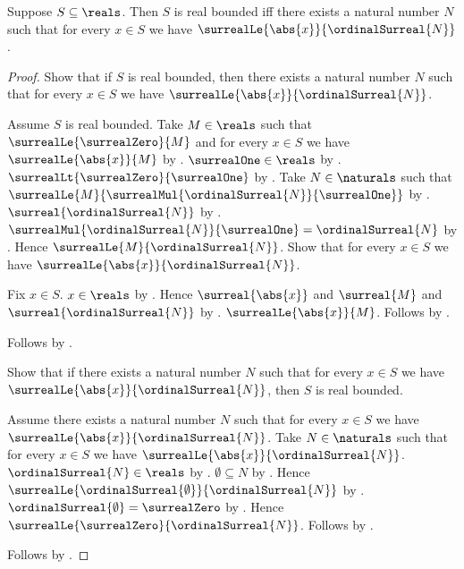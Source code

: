 \begin{theorem}\label{real_bounded_iff_has_natural_bound}
    Suppose $S\subseteq\reals$.
    Then $S$ is real bounded iff there exists a natural number $N$ such that
        for every $x\in S$ we have
            $\surrealLe{\abs{x}}{\ordinalSurreal{N}}$.
\end{theorem}
\begin{proof}
    Show that if $S$ is real bounded, then there exists a natural number
        $N$ such that for every $x\in S$ we have
            $\surrealLe{\abs{x}}{\ordinalSurreal{N}}$.
    \begin{subproof}
        Assume $S$ is real bounded.
        Take $M\in\reals$ such that $\surrealLe{\surrealZero}{M}$ and
            for every $x\in S$ we have $\surrealLe{\abs{x}}{M}$
            by .
        $\surrealOne\in\reals$ by .
        $\surrealLt{\surrealZero}{\surrealOne}$
            by .
        Take $N\in\naturals$ such that
            $\surrealLe{M}{
                \surrealMul{\ordinalSurreal{N}}{\surrealOne}}$
            by .
        $\surreal{\ordinalSurreal{N}}$ by
            .
        $\surrealMul{\ordinalSurreal{N}}{\surrealOne}
            =\ordinalSurreal{N}$ by .
        Hence $\surrealLe{M}{\ordinalSurreal{N}}$.
        Show that for every $x\in S$ we have
            $\surrealLe{\abs{x}}{\ordinalSurreal{N}}$.
        \begin{subproof}
            Fix $x\in S$.
            $x\in\reals$ by .
            Hence $\surreal{\abs{x}}$ and $\surreal{M}$ and
                $\surreal{\ordinalSurreal{N}}$ by
                .
            $\surrealLe{\abs{x}}{M}$.
            Follows by .
        \end{subproof}
        Follows by \auto.
    \end{subproof}
    Show that if there exists a natural number $N$ such that
        for every $x\in S$ we have
            $\surrealLe{\abs{x}}{\ordinalSurreal{N}}$, then
        $S$ is real bounded.
    \begin{subproof}
        Assume there exists a natural number $N$ such that
            for every $x\in S$ we have
                $\surrealLe{\abs{x}}{\ordinalSurreal{N}}$.
        Take $N\in\naturals$ such that for every $x\in S$ we have
            $\surrealLe{\abs{x}}{\ordinalSurreal{N}}$.
        $\ordinalSurreal{N}\in\reals$ by
            .
        $\emptyset\subseteq N$ by .
        Hence $\surrealLe{\ordinalSurreal{\emptyset}}
            {\ordinalSurreal{N}}$ by
            .
        $\ordinalSurreal{\emptyset}=\surrealZero$ by
            .
        Hence $\surrealLe{\surrealZero}{\ordinalSurreal{N}}$.
        Follows by .
    \end{subproof}
    Follows by \auto.
\end{proof}

